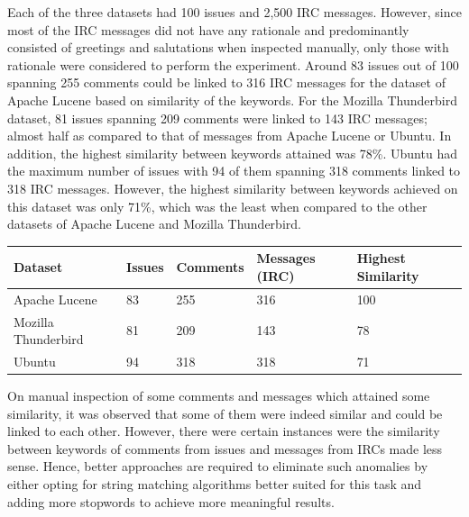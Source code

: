 \documentclass[a4paper,12pt,twoside]{report}
\begin{document}
\leavevmode
\newline
Each of the three datasets had 100 issues and 2,500 \acs{IRC} messages. However, since most of the \acs{IRC} messages did not have any rationale and predominantly consisted of greetings and salutations when inspected manually, only those with rationale were considered to perform the experiment. Around 83 issues out of 100 spanning 255 comments could be linked to 316 \acs{IRC} messages for the dataset of Apache Lucene based on similarity of the keywords. For the Mozilla Thunderbird dataset, 81 issues spanning 209 comments were linked to 143 \acs{IRC} messages; almost half as compared to that of messages from Apache Lucene or Ubuntu. In addition, the highest similarity between keywords attained was 78\%. Ubuntu had the maximum number of issues with 94 of them spanning 318 comments linked to 318 \acs{IRC} messages. However, the highest similarity between keywords achieved on this dataset was only 71\%, which was the least when compared to the other datasets of Apache Lucene and Mozilla Thunderbird. 
\begin{table} %
    \centering
    \begin{adjustbox}{max width=\columnwidth}
    \def\arraystretch{1} %
    \begin{tabular}{p{4cm} p{3cm} p{3cm} p{4cm} p{4cm}}
        \toprule
        \textbf{Dataset} & \textbf{Issues} & \textbf{Comments} & \textbf{Messages (IRC)} & \textbf{Highest Similarity}\\
        \midrule
			Apache Lucene & 83 & 255 & 316 & 100 \\
			Mozilla Thunderbird & 81 & 209 & 143 & 78 \\ 
			Ubuntu & 94 & 318 & 318 & 71 \\
        \midrule
    \end{tabular}
    \end{adjustbox}
    \label{tab:topicLinking}
\end{table}
\leavevmode
\newline \newline
On manual inspection of some comments and messages which attained some similarity, it was observed that some of them were indeed similar and could be linked to each other. However, there were certain instances were the similarity between keywords of comments from issues and messages from \acs{IRC}s made less sense. Hence, better approaches are required to eliminate such anomalies by either opting for string matching algorithms better suited for this task and adding more stopwords to achieve more meaningful results. 
\end{document}
